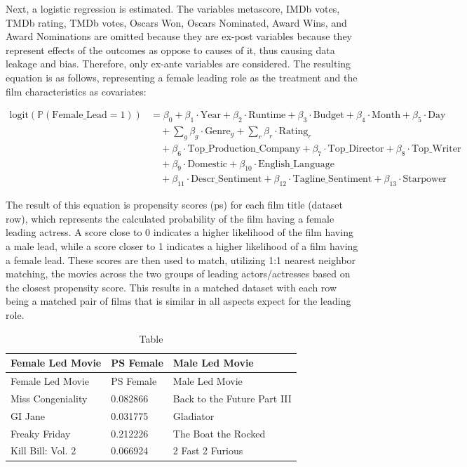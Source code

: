 \documentclass[
]{agujournal2019}
\begin{document}
Next, a logistic regression is estimated. The variables metascore, IMDb
votes, TMDb rating, TMDb votes, Oscars Won, Oscars Nominated, Award
Wins, and Award Nominations are omitted because they are ex-post
variables because they represent effects of the outcomes as oppose to
causes of it, thus causing data leakage and bias. Therefore, only
ex-ante variables are considered. The resulting equation is as follows,
representing a female leading role as the treatment and the film
characteristics as covariates:

\begin{align}
\text{logit}(\mathbb{P}(\text{Female\_Lead} = 1)) &= \beta_0 
+ \beta_1 \cdot \text{Year}
+ \beta_2 \cdot \text{Runtime}
+ \beta_3 \cdot \text{Budget}
+ \beta_4 \cdot \text{Month}
+ \beta_5 \cdot \text{Day} \nonumber \\
&\quad + \sum_{g} \beta_g \cdot \text{Genre}_g
+ \sum_{r} \beta_r \cdot \text{Rating}_r \nonumber \\
&\quad + \beta_6 \cdot \text{Top\_Production\_Company}
+ \beta_7 \cdot \text{Top\_Director}
+ \beta_8 \cdot \text{Top\_Writer} \nonumber \\
&\quad + \beta_9 \cdot \text{Domestic}
+ \beta_{10} \cdot \text{English\_Language} \nonumber \\
&\quad + \beta_{11} \cdot \text{Descr\_Sentiment}
+ \beta_{12} \cdot \text{Tagline\_Sentiment}
+ \beta_{13} \cdot \text{Starpower}
\end{align}

The result of this equation is propensity scores (ps) for each film
title (dataset row), which represents the calculated probability of the
film having a female leading actress. A score close to 0 indicates a
higher likelihood of the film having a male lead, while a score closer
to 1 indicates a higher likelihood of a film having a female lead. These
scores are then used to match, utilizing 1:1 nearest neighbor matching,
the movies across the two groups of leading actors/actresses based on
the closest propensity score. This results in a matched dataset with
each row being a matched pair of films that is similar in all aspects
expect for the leading role.

\begin{longtable}[]{@{}lll@{}}
\caption{Table}\label{tbl-2}\tabularnewline
\toprule\noalign{}
Female Led Movie & PS Female & Male Led Movie \\
\midrule\noalign{}
\endfirsthead
\toprule\noalign{}
Female Led Movie & PS Female & Male Led Movie \\
\midrule\noalign{}
\endhead
\bottomrule\noalign{}
\endlastfoot
Miss Congeniality & 0.082866 & Back to the Future Part III \\
GI Jane & 0.031775 & Gladiator \\
Freaky Friday & 0.212226 & The Boat the Rocked \\
Kill Bill: Vol. 2 & 0.066924 & 2 Fast 2 Furious \\
\end{longtable}
\end{document}
